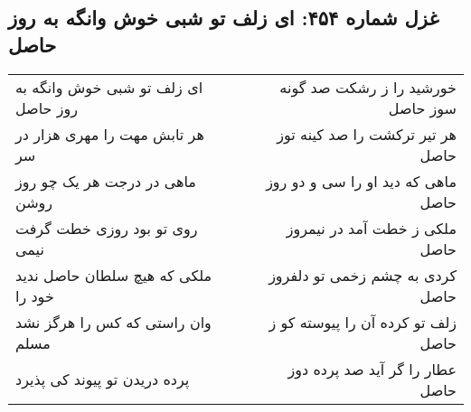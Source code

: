 \begin{center}
\section*{غزل شماره ۴۵۴: ای زلف تو شبی خوش وانگه به روز حاصل}
\label{sec:454}
\begin{longtable}{l p{0.5cm} r}
ای زلف تو شبی خوش وانگه به روز حاصل
&&
خورشید را ز رشکت صد گونه سوز حاصل
\\
هر تابش مهت را مهری هزار در سر
&&
هر تیر ترکشت را صد کینه توز حاصل
\\
ماهی در درجت هر یک چو روز روشن
&&
ماهی که دید او را سی و دو روز حاصل
\\
روی تو بود روزی خطت گرفت نیمی
&&
ملکی ز خطت آمد در نیمروز حاصل
\\
ملکی که هیچ سلطان حاصل ندید خود را
&&
کردی به چشم زخمی تو دلفروز حاصل
\\
وان راستی که کس را هرگز نشد مسلم
&&
زلف تو کرده آن را پیوسته کو ز حاصل
\\
پرده دریدن تو پیوند کی پذیرد
&&
عطار را گر آید صد پرده دوز حاصل
\\
\end{longtable}
\end{center}
